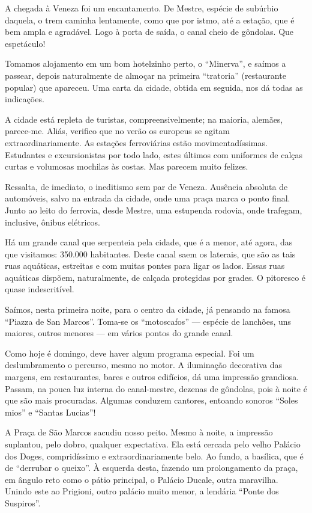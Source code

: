 A chegada à Veneza foi um encantamento. De Mestre, espécie de subúrbio daquela, o trem caminha lentamente, como que por istmo, até a estação, que é bem ampla e agradável. Logo à porta de saída, o canal cheio de gôndolas. Que espetáculo!

Tomamos alojamento em um bom hotelzinho perto, o ``Minerva'', e saímos a passear, depois naturalmente de almoçar na primeira ``tratoria'' (restaurante popular) que apareceu. Uma carta da cidade, obtida em seguida, nos dá todas as indicações.

A cidade está repleta de turistas, compreensivelmente; na maioria, alemães, parece-me. Aliás, verifico que no verão os europeus se agitam extraordinariamente. As estações ferroviárias estão movimentadíssimas. Estudantes e excursionistas por todo lado, estes últimos com uniformes de calças curtas e volumosas mochilas às costas. Mas parecem muito felizes.

Ressalta, de imediato, o ineditismo sem par de Veneza. Ausência absoluta de automóveis, salvo na entrada da cidade, onde uma praça marca o ponto final. Junto ao leito do ferrovia, desde Mestre, uma estupenda rodovia, onde trafegam, inclusive, ônibus elétricos.

Há um grande canal que serpenteia pela cidade, que é a menor, até agora, das que visitamos: 350.000 habitantes. Deste canal saem os laterais, que são as tais ruas aquáticas, estreitas e com muitas pontes para ligar os lados. Essas ruas aquáticas dispõem, naturalmente, de calçada protegidas por grades. O pitoresco é quase indescritível.

Saímos, nesta primeira noite, para o centro da cidade, já pensando na famosa ``Piazza de San Marcos''. Toma-se os ``motoscafos'' --- espécie de lanchões, uns maiores, outros menores --- em vários pontos do grande canal.

Como hoje é domingo, deve haver algum programa especial. Foi um deslumbramento o percurso, mesmo no motor. A iluminação decorativa das margens, em restaurantes, bares e outros edifícios, dá uma impressão grandiosa. Passam, na pouca luz interna do canal-mestre, dezenas de gôndolas, pois à noite é que são mais procuradas. Algumas conduzem cantores, entoando sonoros ``Soles mios'' e ``Santas Lucias''!

A Praça de São Marcos sacudiu nosso peito. Mesmo à noite, a impressão suplantou, pelo dobro, qualquer expectativa. Ela está cercada pelo velho Palácio dos Doges, compridíssimo e extraordinariamente belo. Ao fundo, a basílica, que é de ``derrubar o queixo''. À esquerda desta, fazendo um prolongamento da praça, em ângulo reto como o pátio principal, o Palácio Ducale, outra maravilha. Unindo este ao Prigioni, outro palácio muito menor, a lendária ``Ponte dos Suspiros''.

